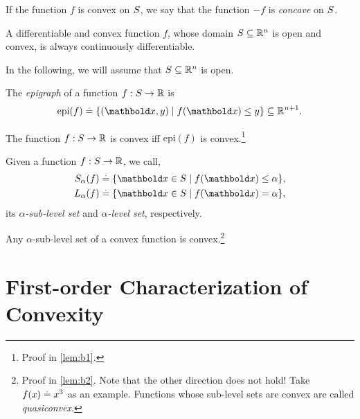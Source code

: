 \begin{rmk}
If the function $f$ is convex on $S$, we say that the function $-f$ is \emph{concave} on $S$.
\end{rmk}

\begin{lem} A differentiable and convex function $f$, whose domain $S \subseteq \mathbb{R}^n$ is open and convex, is always continuously differentiable.
\end{lem} In the following, we will assume that $S \subseteq \mathbb{R}^n$ is open.

\begin{defn}[Epigraph]
The \emph{epigraph} of a function $f : S \to \mathbb{R}$ is \begin{align}
    \mathrm{epi}(f) \defeq \{(\vx,y) \mid f(\vx) \leq y\} \subseteq \R^{n+1}.
\end{align}
\end{defn}
\begin{lem}
The function $f : S \to \mathbb{R}$ is convex iff $\mathrm{epi}(f)$ is convex.\footnote{Proof in \cref{lem:b1}.}
\end{lem}

\begin{defn} Given a function $f : S \to \mathbb{R}$, we call, \begin{align}
    \sS_\alpha(f) &\defeq \{\vx \in \sS \mid f(\vx) \leq \alpha\}, \\
    \sL_\alpha(f) &\defeq \{\vx \in \sS \mid f(\vx) = \alpha\},
\end{align} its \emph{$\alpha$-sub-level set} and \emph{$\alpha$-level set}, respectively.
\end{defn}
\begin{lem}
Any $\alpha$-sub-level set of a convex function is convex.\footnote{Proof in \cref{lem:b2}. Note that the other direction does not hold! Take $f(x) \overset{.}{=} x^3$ as an example. Functions whose sub-level sets are convex are called \emph{quasiconvex}.}
\end{lem}

\section{First-order Characterization of Convexity}

